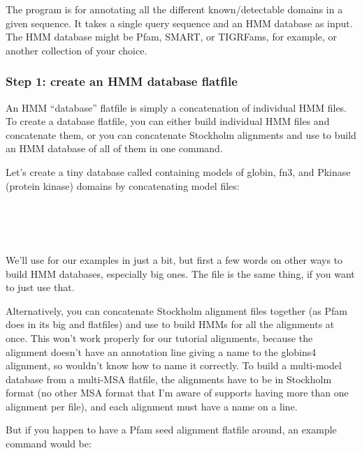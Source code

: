 The  program is for annotating all the different
known/detectable domains in a given sequence. It takes a single query
sequence and an HMM database as input. The HMM database might be Pfam,
SMART, or TIGRFams, for example, or another collection of your choice.

\subsubsection{Step 1: create an HMM database flatfile}

An HMM ``database'' flatfile is simply a concatenation of individual
HMM files. To create a database flatfile, you can either build
individual HMM files and concatenate them, or you can concatenate
Stockholm alignments and use  to build an HMM database
of all of them in one command. 

Let's create a tiny database called  containing models
of globin, fn3, and Pkinase (protein kinase) domains by concatenating
model files:

\\
\\
\\

We'll use  for our examples in just a bit, but first a
few words on other ways to build HMM databases, especially big ones.
The file  is the same thing, if you want to
just use that.

Alternatively, you can concatenate Stockholm alignment files together
(as Pfam does in its big  and 
flatfiles) and use  to build HMMs for all the
alignments at once. This won't work properly for our tutorial
alignments, because the  alignment doesn't have an
 annotation line giving a name to the globins4
alignment, so  wouldn't know how to name it
correctly. To build a multi-model database from a multi-MSA flatfile,
the alignments have to be in Stockholm format (no other MSA format
that I'm aware of supports having more than one alignment per file),
and each alignment must have a name on a  line.

But if you happen to have a Pfam seed alignment flatfile
 around, an example command would be:

